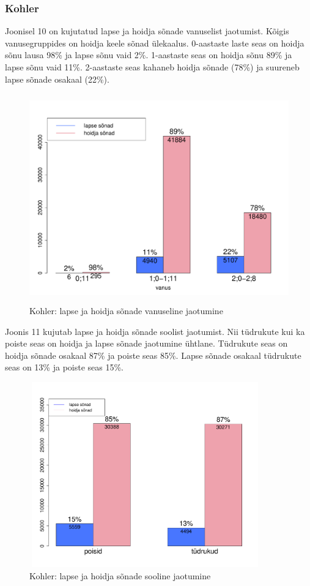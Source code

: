 \documentclass[12pt]{article}
\begin{document}
\subsubsection{Kohler}

Joonisel 10 on kujutatud lapse ja hoidja sõnade vanuselist jaotumist. Kõigis vanusegruppides on hoidja keele sõnad ülekaalus. 0-aastaste laste seas on hoidja sõnu lausa 98\% ja lapse sõnu vaid 2\%. 1-aastaste seas on hoidja sõnu 89\% ja lapse sõnu vaid 11\%. 2-aastaste seas kahaneb hoidja sõnade (78\%) ja suureneb lapse sõnade osakaal (22\%).

\begin{figure}[H]
    \centering
    \includegraphics[width=12cm, height=9cm]{kohler_vanus_sonad}
    \caption{Kohler: lapse ja hoidja sõnade vanuseline jaotumine}
\end{figure}

Joonis 11 kujutab lapse ja hoidja sõnade soolist jaotumist. Nii tüdrukute kui ka poiste seas on hoidja ja lapse sõnade jaotumine ühtlane. Tüdrukute seas on hoidja sõnade osakaal 87\% ja poiste seas 85\%. Lapse sõnade osakaal tüdrukute seas on 13\% ja poiste seas 15\%.

\begin{figure}[H]
    \centering
    \includegraphics[width=10cm, height=8cm]{kohler_sugu_sonad}
    \caption{Kohler: lapse ja hoidja sõnade sooline jaotumine}
\end{figure}
\end{document}
